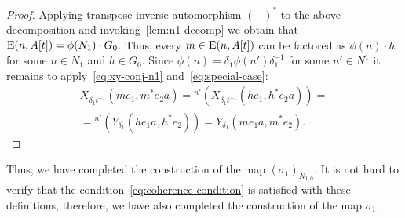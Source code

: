 \begin{proof}
    Applying transpose-inverse automorphism $(-)^*$ to the above decomposition and invoking~\cref{lem:n1-decomp} we obtain that $\operatorname{E}(n, A[t]) = \phi(N_1) \cdot G_0$.
    Thus, every $m \in \operatorname{E}(n, A[t])$ can be factored as $\phi(n) \cdot h$ for some $n\in N_1$ and $h \in G_0$.
    Since $\phi(n) = \delta_1 \phi(n') \delta_1^{-1}$ for some $n' \in N^1$ it remains to apply~\eqref{eq:xy-conj-n1} and~\eqref{eq:special-case}:
    \begin{multline}
        \nonumber X_{\delta_1 t^{-1}}(me_1, m^*e_{2}a) = {}^{n'}(X_{\delta_1 t^{-1}}(he_1, h^*e_{2}a)) = \\
        = {}^{n'}(Y_{\delta_1}(he_{1}a, h^*e_2)) = Y_{\delta_1}(me_{1}a, m^{*} e_{2}).
    \end{multline}
\end{proof}

Thus, we have completed the construction of the map $(\sigma_1)_{N_{1,0}}$.
It is not hard to verify that the condition~\eqref{eq:coherence-condition} is satisfied with these definitions,
therefore, we have also completed the construction of the map $\sigma_1$.


